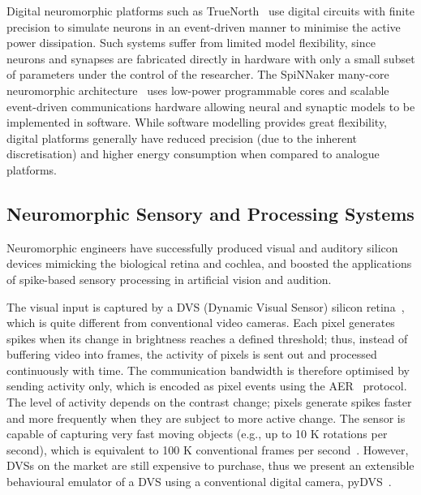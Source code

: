 Digital neuromorphic platforms such as TrueNorth~\citep{merolla2014million} use digital circuits with finite precision to simulate neurons in an event-driven manner to minimise the active power dissipation.
Such systems suffer from limited model flexibility, since neurons and synapses are fabricated directly in hardware with only a small subset of parameters under the control of the researcher.
The SpiNNaker many-core neuromorphic architecture~\citep{furber2014spinnaker} uses low-power programmable cores and scalable event-driven communications hardware allowing neural and synaptic models to be implemented in software.
While software modelling provides great flexibility, digital platforms generally have reduced precision (due to the inherent discretisation) and higher energy consumption when compared to analogue platforms.

\subsection{Neuromorphic Sensory and Processing Systems}
\label{sec:morph}
Neuromorphic engineers have successfully produced visual and auditory silicon devices mimicking the biological retina and cochlea, and boosted the applications of spike-based sensory processing in artificial vision and audition.

The visual input is captured by a DVS (Dynamic Visual Sensor) silicon retina~\citep{serrano2013128, delbruck2008frame}, which is quite different from conventional video cameras.
Each pixel generates spikes when its change in brightness reaches a defined threshold;
thus, instead of buffering video into frames, the activity of pixels is sent out and processed continuously with time.
The communication bandwidth is therefore optimised by sending activity only, which is encoded as pixel events using the AER~\citep{lazzaro1995multi} protocol.
The level of activity depends on the contrast change; pixels generate spikes faster and more frequently when they are subject to more active change.
The sensor is capable of capturing very fast moving objects (e.g., up to 10 K rotations per second), which is equivalent to 100 K conventional frames per second~\citep{lenero20113}.
However, DVSs on the market are still expensive to purchase, thus we present an extensible behavioural emulator of a DVS using a conventional digital camera, pyDVS~\citep{7850249}.

